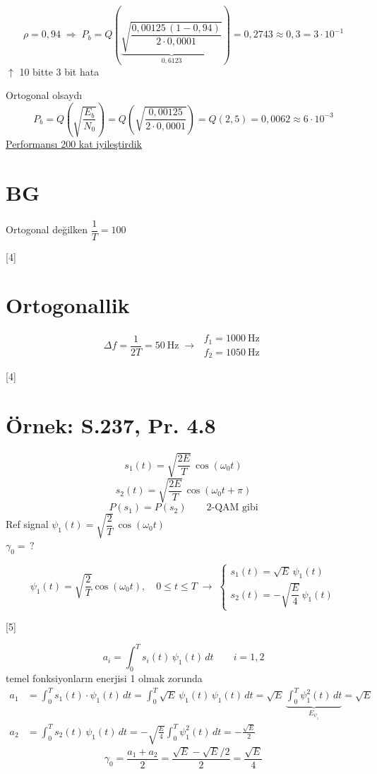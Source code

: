 \documentclass[11pt,a4paper]{article}
\begin{document}
\[ \rho=0{,}94 \;\Rightarrow\; P_b = Q\!\left(\underbrace{\sqrt{\frac{0{,}00125\,(1-0{,}94)}{2\cdot 0{,}0001}}}_{0{,}6123}\right) = 0{,}2743 \approx 0{,}3 = 3\cdot 10^{-1} \]
\noindent \hfill $\uparrow$ 10 bitte 3 bit hata

\noindent Ortogonal olsaydı
\[ P_b = Q\!\left(\sqrt{\frac{E_b}{N_0}}\right) = Q\!\left(\sqrt{\frac{0{,}00125}{2\cdot 0{,}0001}}\right) = Q(2{,}5) = 0{,}0062 \approx 6\cdot 10^{-3} \]
\noindent \underline{Performansı 200 kat iyileştirdik}

\section{BG}
\noindent Ortogonal değilken \quad $\dfrac{1}{T}=100$

[4]

\section{Ortogonallik}
\[ \Delta f = \frac{1}{2T} = 50\ \mathrm{Hz} \;\rightarrow\; \begin{array}{l} f_1=1000\ \mathrm{Hz}\\ f_2=1050\ \mathrm{Hz}\end{array} \]

[4]

\section{Örnek: S.237, Pr. 4.8}
\[ s_1(t)=\sqrt{\frac{2E}{T}}\,\cos(\omega_0 t) \]
\[ s_2(t)=\sqrt{\frac{2E}{T}}\,\cos(\omega_0 t+\pi) \]
\[ P(s_1)=P(s_2) \qquad \text{2-QAM gibi} \]
\noindent Ref signal $\psi_1(t)=\sqrt{\dfrac{2}{T}}\,\cos(\omega_0 t)$ \\
$\gamma_0=\,?$

\[ \psi_1(t)=\sqrt{\frac{2}{T}}\cos(\omega_0 t),\quad 0\le t\le T \;\rightarrow\; \left\{\begin{array}{l} s_1(t)=\sqrt{E}\,\psi_1(t)\\[2pt] s_2(t)=-\sqrt{\dfrac{E}{4}}\,\psi_1(t)\end{array}\right. \]

[5]

\[ a_i=\int_0^T s_i(t)\,\psi_1(t)\,dt \qquad i=1,2 \]
\noindent temel fonksiyonların enerjisi 1 olmak zorunda
\begin{align*}
a_1 &= \int_0^T s_1(t)\cdot\psi_1(t)\,dt=\int_0^T \sqrt{E}\,\psi_1(t)\,\psi_1(t)\,dt=\sqrt{E}\,\underbrace{\int_0^T \psi_1^2(t)\,dt}_{E_{\psi_1}}=\sqrt{E}\\
a_2 &= \int_0^T s_2(t)\,\psi_1(t)\,dt=-\sqrt{\frac{E}{4}}\int_0^T\psi_1^2(t)\,dt=-\frac{\sqrt{E}}{2}
\end{align*}
\[ \gamma_0=\frac{a_1+a_2}{2}=\frac{\sqrt{E}-\sqrt{E}/2}{2}=\frac{\sqrt{E}}{4} \]
\end{document}
